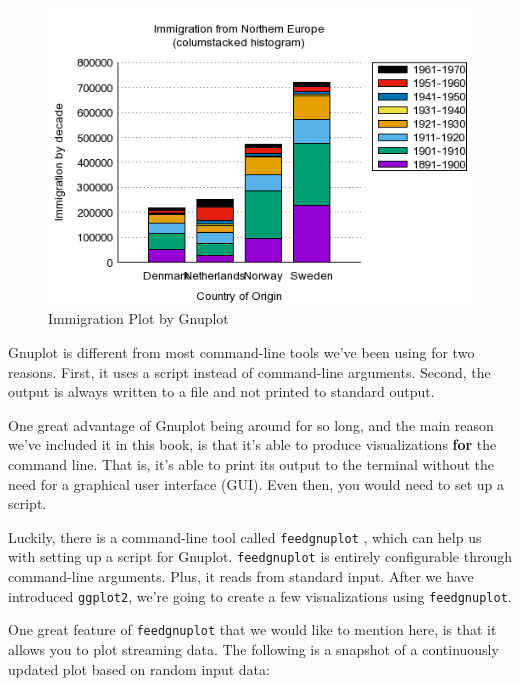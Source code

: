 \documentclass[
]{book}
\theoremstyle{definition}
\theoremstyle{definition}
\theoremstyle{definition}
\theoremstyle{remark}
\begin{document}
\begin{figure}

{\centering \includegraphics[width=6.94in]{images/histograms.6} 

}

\caption{Immigration Plot by Gnuplot}\label{fig:unnamed-chunk-14}
\end{figure}

Gnuplot is different from most command-line tools we've been using for two reasons. First, it uses a script instead of command-line arguments. Second, the output is always written to a file and not printed to standard output.

One great advantage of Gnuplot being around for so long, and the main reason we've included it in this book, is that it's able to produce visualizations \textbf{for} the command line. That is, it's able to print its output to the terminal without the need for a graphical user interface (GUI). Even then, you would need to set up a script.

Luckily, there is a command-line tool called \texttt{feedgnuplot} \citep{feedgnuplot}, which can help us with setting up a script for Gnuplot. \texttt{feedgnuplot} is entirely configurable through command-line arguments. Plus, it reads from standard input. After we have introduced \texttt{ggplot2}, we're going to create a few visualizations using \texttt{feedgnuplot}.

One great feature of \texttt{feedgnuplot} that we would like to mention here, is that it allows you to plot streaming data. The following is a snapshot of a continuously updated plot based on random input data:
\end{document}
